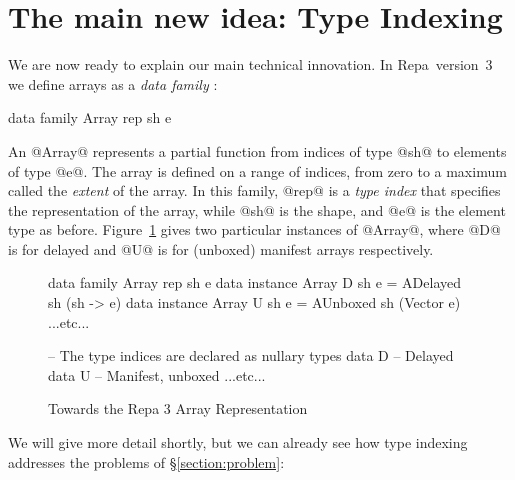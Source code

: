 
\section{The main new idea: Type Indexing}
\label{sec:type-indexing}

We are now ready to explain our main technical innovation.
In Repa~version~3 we define arrays as a \emph{data family} \cite{Chakravarty:AssocTypes}:
%
\begin{code}
    data family Array rep sh e
\end{code}
%
An @Array@ represents a partial function from indices of type @sh@ to elements of type @e@.  The array is defined on a range of indices, from zero to a maximum called the \emph{extent} of the array. In this family, @rep@ is a \emph{type index} that specifies the representation of the array, while @sh@ is the shape, and @e@ is the element type as before. Figure~\ref{figure:Repa3Array} gives two particular instances of @Array@, where @D@ is for delayed and @U@ is for (unboxed) manifest arrays respectively.

\eject
\begin{figure}
\begin{small}
\begin{code}
data family Array rep sh e
data instance Array D sh e = ADelayed sh (sh -> e)
data instance Array U sh e = AUnboxed sh (Vector e)
...etc...

-- The type indices are declared as nullary types
data D   -- Delayed
data U   -- Manifest, unboxed
...etc...
\end{code}
\end{small}
\caption{Towards the Repa 3 Array Representation}
\label{figure:Repa3Array}
\end{figure}

We will give more detail shortly, but we can already see how type indexing addresses the problems of \S\ref{section:problem}:

